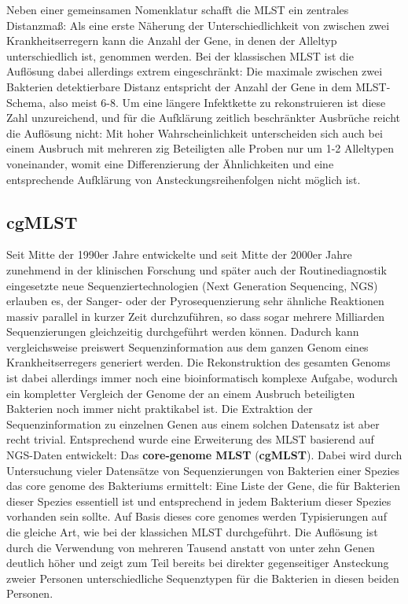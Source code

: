 Neben einer gemeinsamen Nomenklatur schafft die MLST ein zentrales Distanzmaß: Als eine erste Näherung der Unterschiedlichkeit von zwischen zwei Krankheitserregern kann die Anzahl der Gene, in denen der Alleltyp unterschiedlich ist, genommen werden. Bei der klassischen MLST ist die Auflösung dabei allerdings extrem eingeschränkt: Die maximale zwischen zwei Bakterien detektierbare Distanz entspricht der Anzahl der Gene in dem MLST-Schema, also meist 6-8. Um eine längere Infektkette zu rekonstruieren ist diese Zahl unzureichend, und für die Aufklärung zeitlich beschränkter Ausbrüche reicht die Auflösung nicht: Mit hoher Wahrscheinlichkeit unterscheiden sich auch bei einem Ausbruch mit mehreren zig Beteiligten alle Proben nur um 1-2 Alleltypen voneinander, womit eine Differenzierung der Ähnlichkeiten und eine entsprechende Aufklärung von Ansteckungsreihenfolgen nicht möglich ist.  

\subsection{cgMLST}

Seit Mitte der 1990er Jahre entwickelte und seit Mitte der 2000er Jahre zunehmend in der klinischen Forschung und später auch der Routinediagnostik eingesetzte neue Sequenziertechnologien (Next Generation Sequencing, NGS) erlauben es, der Sanger- oder der Pyrosequenzierung sehr ähnliche Reaktionen massiv parallel in kurzer Zeit durchzuführen, so dass sogar mehrere Milliarden Sequenzierungen gleichzeitig durchgeführt werden können. Dadurch kann vergleichsweise preiswert Sequenzinformation aus dem ganzen Genom eines Krankheitserregers generiert werden. Die Rekonstruktion des gesamten Genoms ist dabei allerdings immer noch eine bioinformatisch komplexe Aufgabe, wodurch ein kompletter Vergleich der Genome der an einem Ausbruch beteiligten Bakterien noch immer nicht praktikabel ist. Die Extraktion der Sequenzinformation zu einzelnen Genen aus einem solchen Datensatz ist aber recht trivial. Entsprechend wurde eine Erweiterung des MLST basierend auf NGS-Daten entwickelt: Das \textbf{core-genome MLST} (\textbf{cgMLST}). Dabei wird durch Untersuchung vieler Datensätze von Sequenzierungen von Bakterien einer Spezies das core genome des Bakteriums ermittelt: Eine Liste der Gene, die für Bakterien dieser Spezies essentiell ist und entsprechend in jedem Bakterium dieser Spezies vorhanden sein sollte. Auf Basis dieses core genomes werden Typisierungen auf die gleiche Art, wie bei der klassichen MLST durchgeführt. Die Auflösung ist durch die Verwendung von mehreren Tausend anstatt von unter zehn Genen deutlich höher und zeigt zum Teil bereits bei direkter gegenseitiger Ansteckung zweier Personen unterschiedliche Sequenztypen für die Bakterien in diesen beiden Personen.

